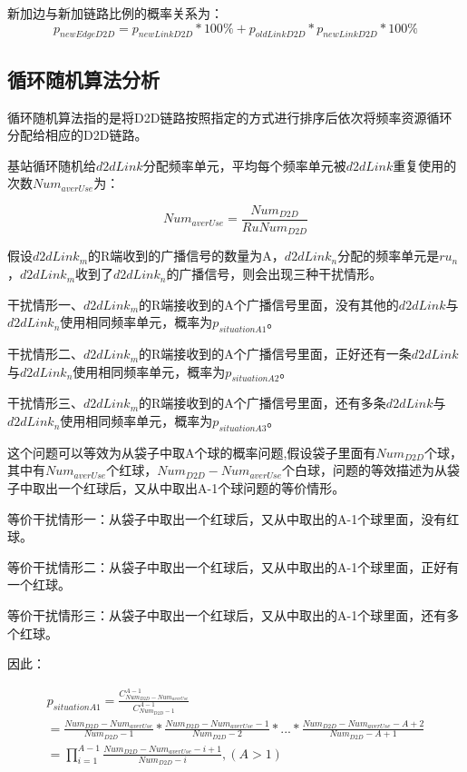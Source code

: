 \documentclass[figurelist,tablelist,algorithmlist,nomlist,masters]{seuthesix}
\begin{document}
	新加边与新加链路比例的概率关系为：
	\begin{equation}\label{eq3.1}
	{p_{newEdgeD2D}} = {p_{newLinkD2D}}*100\%  + {p_{oldLinkD2D}}*{p_{newLinkD2D}}*100\% 
	\end{equation}
	
	\subsection{循环随机算法分析}
	
	循环随机算法指的是将D2D链路按照指定的方式进行排序后依次将频率资源循环分配给相应的D2D链路。
	
	基站循环随机给$d2dLink$分配频率单元，平均每个频率单元被$d2dLink$重复使用的次数$Nu{m_{averUse}}$为： 
	
	\begin{equation}\label{eq3.1}
	Nu{m_{averUse}} = \frac{{Nu{m_{D2D}}}}{{RuNu{m_{D2D}}}}
	\end{equation}
	
	假设$d2dLin{k_m}$的R端收到的广播信号的数量为A，$d2dLin{k_n}$分配的频率单元是$r{u_n}$，$d2dLin{k_m}$收到了$d2dLin{k_n}$的广播信号，则会出现三种干扰情形。
	
	干扰情形一、$d2dLin{k_m}$的R端接收到的A个广播信号里面，没有其他的$d2dLink$与$d2dLin{k_n}$使用相同频率单元，概率为${p_{situationA1}}$。
	
	干扰情形二、$d2dLin{k_m}$的R端接收到的A个广播信号里面，正好还有一条$d2dLink$与$d2dLin{k_n}$使用相同频率单元，概率为${p_{situationA2}}$。
	
	干扰情形三、$d2dLin{k_m}$的R端接收到的A个广播信号里面，还有多条$d2dLink$与$d2dLin{k_n}$使用相同频率单元，概率为${p_{situationA3}}$。
	
	这个问题可以等效为从袋子中取A个球的概率问题,假设袋子里面有$Nu{m_{D2D}}$个球，其中有$Nu{m_{averUse}}$个红球，$Nu{m_{D2D}} - Nu{m_{averUse}}$个白球，问题的等效描述为从袋子中取出一个红球后，又从中取出A-1个球问题的等价情形。
	
	等价干扰情形一：从袋子中取出一个红球后，又从中取出的A-1个球里面，没有红球。
	
	等价干扰情形二：从袋子中取出一个红球后，又从中取出的A-1个球里面，正好有一个红球。
	
	等价干扰情形三：从袋子中取出一个红球后，又从中取出的A-1个球里面，还有多个红球。
	
	因此：
	
	\begin{equation}\label{eq3.1}
	\begin{array}{c}
	{p_{situationA1}} = \frac{{C_{Nu{m_{D2D}} - Nu{m_{averUse}}}^{A - 1}}}{{C_{Nu{m_{D2D}} - 1}^{A - 1}}}\\
	= \frac{{Nu{m_{D2D}} - Nu{m_{averUse}}}}{{Nu{m_{D2D}} - 1}}*\frac{{Nu{m_{D2D}} - Nu{m_{averUse}} - 1}}{{Nu{m_{D2D}} - 2}}*...*\frac{{Nu{m_{D2D}} - Nu{m_{averUse}} - A + 2}}{{Nu{m_{D2D}} - A + 1}}\\
	= \prod\limits_{i = 1}^{A - 1} {\frac{{Nu{m_{D2D}} - Nu{m_{averUse}} - i + {1}}}{{Nu{m_{D2D}} - i}},(A > 1)} 
	\end{array}
	\end{equation}
	
\end{document}
